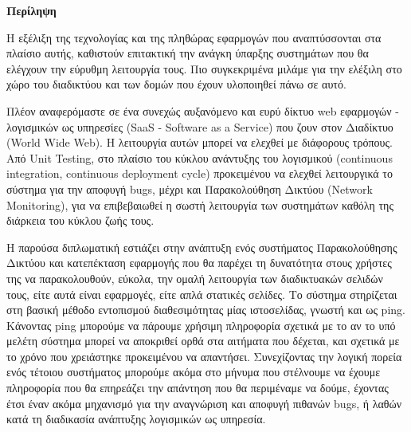 \begin{center}
  \centering

  \vspace{0.5cm}
  \centering
  \textbf{\Large{Περίληψη}}

  \vspace{1cm}

\end{center}

  Η εξέλιξη της τεχνολογίας και της πληθώρας εφαρμογών που αναπτύσσονται στα πλαίσιο αυτής, καθιστούν επιτακτική την ανάγκη ύπαρξης συστημάτων που θα ελέγχουν την εύρυθμη λειτουργία τους. Πιο συγκεκριμένα μιλάμε για την ελέξιλη στο χώρο του διαδικτύου και των δομών που έχουν υλοποιηθεί πάνω σε αυτό.
  
  Πλέον αναφερόμαστε σε ένα συνεχώς αυξανόμενο και ευρύ δίκτυο web εφαρμογών - λογισμικών ως υπηρεσίες (SaaS - Software as a Service) που ζουν στον Διαδίκτυο (World Wide Web). H λειτουργία αυτών μπορεί να ελεχθεί με διάφορους τρόπους. Από Unit Testing, στο πλαίσιο του κύκλου ανάντυξης του λογισμικού (continuous integration, continuous deployment cycle) προκειμένου να ελεχθεί λειτουργικά το σύστημα για την αποφυγή bugs, μέχρι και Παρακολούθηση Δικτύου (Network Monitoring), για να επιβεβαιωθεί η σωστή λειτουργία των συστημάτων καθόλη της διάρκεια του κύκλου ζωής τους.
  
  Η παρούσα διπλωματική εστιάζει στην ανάπτυξη ενός συστήματος Παρακολούθησης Δικτύου και κατεπέκταση εφαρμογής που θα παρέχει τη δυνατότητα στους χρήστες της να παρακολουθούν, εύκολα, την ομαλή λειτουργία των διαδικτυακών σελιδών τους, είτε αυτά είναι εφαρμογές, είτε απλά στατικές σελίδες. Το σύστημα στηρίζεται στη βασική μέθοδο εντοπισμού διαθεσιμότητας μίας ιστοσελίδας, γνωστή και ως ping. Κάνοντας ping μπορούμε να πάρουμε χρήσιμη πληροφορία σχετικά με το αν το υπό μελέτη σύστημα μπορεί να αποκριθεί ορθά στα αιτήματα που δέχεται, και σχετικά με το χρόνο που χρειάστηκε προκειμένου να απαντήσει. Συνεχίζοντας την λογική πορεία ενός τέτοιου συστήματος μπορούμε ακόμα στο μήνυμα που στέλνουμε να έχουμε πληροφορία που θα επηρεάζει την απάντηση που θα περιμέναμε να δούμε, έχοντας έτσι έναν ακόμα μηχανισμό για την αναγνώριση και αποφυγή πιθανών bugs, ή λαθών κατά τη διαδικασία ανάπτυξης λογισμικών ως υπηρεσία.
